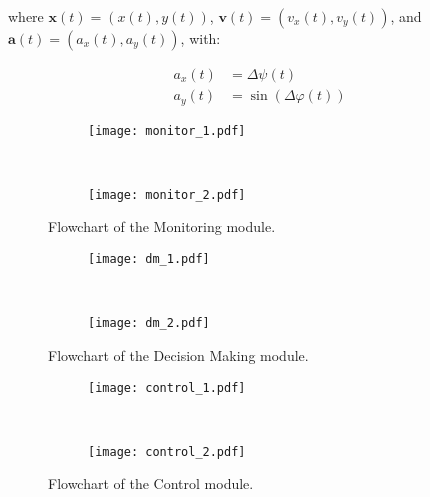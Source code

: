 where $\mathbf{x}(t) = (x(t), y(t))$, $\mathbf{v}(t) = (v_x(t), v_y(t))$, and $\mathbf{a}(t) = (a_x(t), a_y(t))$, with:

\begin{equation}
\begin{aligned}
	a_x(t) & = \Delta\psi(t) \\
	a_y(t) & = \sin(\Delta\varphi(t))
\end{aligned}
\end{equation}

\begin{figure}
\centering
\begin{subfigure}{1\textwidth}
  \centering
  \texttt{[image: monitor\_1.pdf]}
\end{subfigure}\\ \vspace{2em}
\begin{subfigure}{1\textwidth}
  \centering
  \texttt{[image: monitor\_2.pdf]}
\end{subfigure} \vspace{2em}
\caption{Flowchart of the Monitoring module.}
\label{fig:monitor}
\end{figure}

\begin{figure}
\centering
\begin{subfigure}{1\textwidth}
  \centering
  \texttt{[image: dm\_1.pdf]}
\end{subfigure}\\ \vspace{2em}
\begin{subfigure}{1\textwidth}
  \centering
  \texttt{[image: dm\_2.pdf]}
\end{subfigure} \vspace{2em}
\caption{Flowchart of the Decision Making module.}
\label{fig:dm}
\end{figure}

\begin{figure}
\centering
\begin{subfigure}{1\textwidth}
  \centering
  \texttt{[image: control\_1.pdf]}
\end{subfigure}\\ \vspace{2em}
\begin{subfigure}{1\textwidth}
  \centering
  \texttt{[image: control\_2.pdf]}
\end{subfigure} \vspace{2em}
\caption{Flowchart of the Control module.}
\label{fig:control}
\end{figure}

